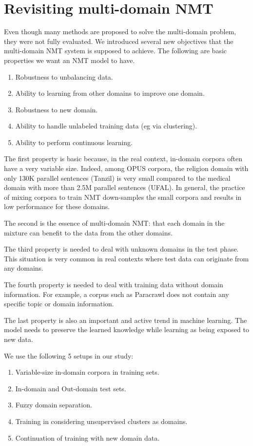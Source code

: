 \documentclass[12pt,a4paper,twoside]{report}
\theoremstyle{definition}
\begin{document}
\section*{Revisiting multi-domain NMT}
Even though many methods are proposed to solve the multi-domain problem, they were not fully evaluated. We introduced several new objectives that the multi-domain NMT system is supposed to achieve. The following are basic properties we want an NMT model to have.
\begin{enumerate}
	\item \label{ax:1} Robustness to unbalancing data.
	\item \label{ax:2} Ability to learning from other domains to improve one domain.
	\item \label{ax:3} Robustness to new domain.
	\item \label{ax:4} Ability to handle unlabeled training data (eg via clustering).
	\item \label{ax:5} Ability to perform continuous learning.
\end{enumerate}

The first property is basic because, in the real context, in-domain corpora often have a very variable size. Indeed, among OPUS corpora, the religion domain with only 130K parallel sentences (Tanzil) is very small compared to the medical domain with more than 2.5M parallel sentences (UFAL). In general, the practice of mixing corpora to train NMT down-samples the small corpora and results in low performance for these domains. 

The second is the essence of multi-domain NMT: that each domain in the mixture can benefit to the data from the other domains. 

The third property is needed to deal with unknown domains in the test phase. This situation is very common in real contexts where test data can originate from any domains. 

The fourth property is needed to deal with training data without domain information. For example, a corpus such as Paracrawl does not contain any specific topic or domain information. 

The last property is also an important and active trend in machine learning. The model needs to preserve the learned knowledge while learning as being exposed to new data.

We use the following 5 setups in our study:
\begin{enumerate}
	\item \label{setup:1} Variable-size in-domain corpora in training sets.
	\item \label{setup:2} In-domain and Out-domain test sets.
	\item \label{setup:3} Fuzzy domain separation.
	\item \label{setup:4} Training in considering unsupervised clusters as domains.
	\item \label{setup:5} Continuation of training with new domain data.
\end{enumerate}
\end{document}
